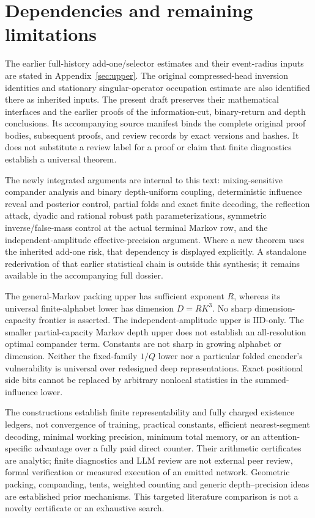 \documentclass[11pt,letterpaper]{article}
\theoremstyle{definition}\newtheorem{definition}[theorem]{Definition}
\theoremstyle{remark}\newtheorem{remark}[theorem]{Remark}
\begin{document}
\section{Dependencies and remaining limitations}\label{sec:map}
The earlier full-history add-one/selector estimates and their event-radius inputs are stated in Appendix~\ref{sec:upper}. The original compressed-head inversion identities and stationary singular-operator occupation estimate are also identified there as inherited inputs. The present draft preserves their mathematical interfaces and the earlier proofs of the information-cut, binary-return and depth conclusions. Its accompanying source manifest binds the complete original proof bodies, subsequent proofs, and review records by exact versions and hashes. It does not substitute a review label for a proof or claim that finite diagnostics establish a universal theorem.

The newly integrated arguments are internal to this text: mixing-sensitive compander analysis and binary depth-uniform coupling, deterministic influence reveal and posterior control, partial folds and exact finite decoding, the reflection attack, dyadic and rational robust path parameterizations, symmetric inverse/false-mass control at the actual terminal Markov row, and the independent-amplitude effective-precision argument. Where a new theorem uses the inherited add-one risk, that dependency is displayed explicitly. A standalone rederivation of that earlier statistical chain is outside this synthesis; it remains available in the accompanying full dossier.

The general-Markov packing upper has sufficient exponent $R$, whereas its universal finite-alphabet lower has dimension $D=RK^3$. No sharp dimension-capacity frontier is asserted. The independent-amplitude upper is IID-only. The smaller partial-capacity Markov depth upper does not establish an all-resolution optimal compander term. Constants are not sharp in growing alphabet or dimension. Neither the fixed-family $1/Q$ lower nor a particular folded encoder's vulnerability is universal over redesigned deep representations. Exact positional side bits cannot be replaced by arbitrary nonlocal statistics in the summed-influence lower.

The constructions establish finite representability and fully charged existence ledgers, not convergence of training, practical constants, efficient nearest-segment decoding, minimal working precision, minimum total memory, or an attention-specific advantage over a fully paid direct counter. Their arithmetic certificates are analytic; finite diagnostics and LLM review are not external peer review, formal verification or measured execution of an emitted network. Geometric packing, companding, tents, weighted counting and generic depth--precision ideas are established prior mechanisms. This targeted literature comparison is not a novelty certificate or an exhaustive search.

\begingroup
\small
\setlength{\bibsep}{4pt}


\endgroup
\end{document}
